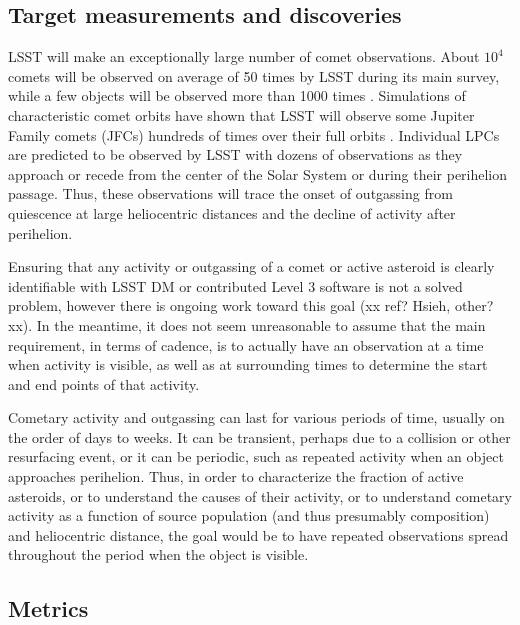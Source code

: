 
\subsection{Target measurements and discoveries}
\label{sec:\secname:targets}

LSST will make an exceptionally large number of comet
observations.  About $10^4$ comets will be observed on average
of 50 times by LSST during its main survey, while a few objects
will be observed more than 1000 times
\citep{2010PhDT.......241S}.  Simulations of characteristic
comet orbits have shown that LSST will observe some Jupiter
Family comets (JFCs) hundreds of times over their full orbits
\citep{2010PhDT.......241S}.  Individual LPCs are predicted to
be observed by LSST with dozens of observations as they
approach or recede from the center of the Solar System or
during their perihelion passage.  Thus, these observations
will trace the onset of outgassing from quiescence at large
heliocentric distances and the decline of activity after
perihelion.

Ensuring that any activity or outgassing of a comet or active asteroid
is clearly identifiable with LSST DM or contributed Level 3 software is not a
solved problem, however there is ongoing work toward this goal (xx
ref? Hsieh, other? xx). In the meantime, it does not seem unreasonable
to assume that the main requirement, in terms of cadence, is to actually
have an observation at a time when activity is visible, as well as at
surrounding times to determine the start and end points of that activity.

Cometary activity and outgassing can last for various periods of time,
usually on the order of days to weeks. It can be transient, perhaps
due to a collision or other resurfacing event, or it can be periodic,
such as repeated activity when an object approaches perihelion. Thus,
in order to characterize the fraction of active asteroids, or to
understand the causes of their activity, or to understand cometary
activity as a function of source population (and thus presumably
composition) and heliocentric distance, the goal would be to have
repeated observations spread throughout the period when the object is visible.



\subsection{Metrics}
\label{sec:\secname:metrics}

